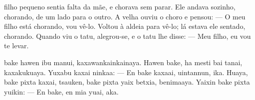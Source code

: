 

 filho pequeno sentia falta
da mãe, e chorava sem parar.
Ele andava sozinho, chorando,
de um lado para o outro.
A velha ouviu o choro e pensou:\break
--- O meu filho está chorando, vou vê-lo.
Voltou à aldeia para vê-lo; lá estava ele
sentado, chorando. Quando viu o tatu,
alegrou-se, e o tatu lhe disse:\break
--- Meu filho, eu vou te levar.

\vspace{2em}

 bake hawen ibu
manui, kaxawankainkainaya.
Hawen bake, ha mesti bai
tanai, kaxakukuaya.
Yuxabu kaxai ninkaa:\break
--- En bake kaxaai, uintannun, ika.
Huaya, bake pixta kaxai, tsauken,
bake pixta yaix betxia, benimaaya.
Yaixin bake pixta yuikin:\break
--- En bake, en mia yuai, aka.

\vspace*{\fill}

